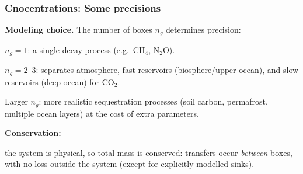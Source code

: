 \documentclass[xcolor=x11names,compress,aspectratio=169]{beamer}%
\makeatletter
\renewenvironment{itemize}{\begin{compactitemize}[<+-| alert@+>]}{\end{compactitemize}}
\makeatother
\begin{document}
\begin{frame}%
%

\frametitle{Cnocentrations: Some precisions}%


\medskip\textbf{Modeling choice.} The number of boxes $n_{g}$ determines precision:

\begin{itemize}
\item $n_{g}=1$: a single decay process (e.g.\ CH$_{4}$, N$_{2}$O).

\item $n_{g}=2$--$3$: separates atmosphere, fast reservoirs (biosphere/upper
ocean), and slow reservoirs (deep ocean) for CO$_{2}$.

\item Larger $n_{g}$: more realistic sequestration processes (soil carbon,
permafrost, multiple ocean layers) at the cost of extra parameters.
\vspace{2ex}
\end{itemize}

\textbf{Conservation: }

\begin{itemize}
\item the system is physical, so total mass is conserved: transfers occur
\textit{between} boxes, with no loss outside the system (except for explicitly
modelled sinks).
\end{itemize}

%

\transboxout
\end{frame}%
%
\end{document}
